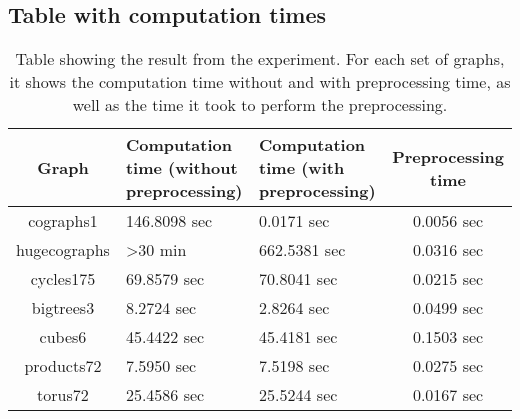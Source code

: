 \documentclass[twoside]{article}
\theoremstyle{definition}
\theoremstyle{plain}
\begin{document}
\begin{appendices}
\section{Table with computation times}
\begin{table}[h]
\begin{tabular}{c|C{0.3\textwidth}|C{0.3\textwidth}|c}
Graph & Computation time (without preprocessing) & Computation time (with preprocessing) & Preprocessing time \\
\hline
cographs1 & 146.8098 sec & 0.0171 sec & 0.0056 sec \\
hugecographs & >30 min & 662.5381 sec & 0.0316 sec \\
cycles175 & 69.8579 sec & 70.8041 sec & 0.0215 sec\\
bigtrees3 & 8.2724 sec & 2.8264 sec & 0.0499 sec\\
cubes6 & 45.4422 sec & 45.4181 sec & 0.1503 sec\\
products72 & 7.5950 sec & 7.5198 sec & 0.0275 sec\\
torus72 & 25.4586 sec & 25.5244 sec & 0.0167 sec\\
\end{tabular}
\caption{Table showing the result from the experiment. For each set of graphs, it shows the computation time without and with preprocessing time, as well as the time it took to perform the preprocessing.}
\label{table:results}
\end{table}
\end{appendices}
\end{document}
